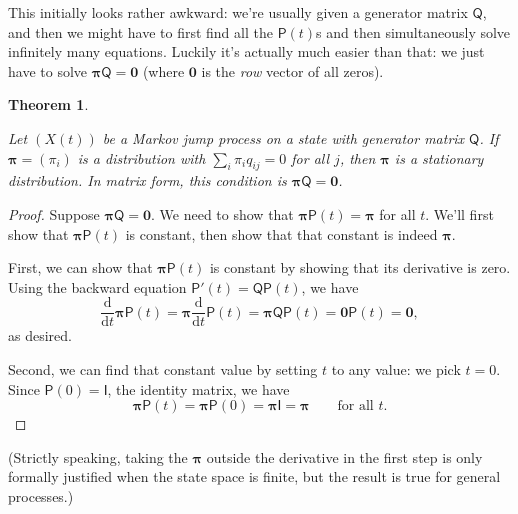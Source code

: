 \documentclass[
  a4paper,
]{article}
\newtheorem{theorem}{Theorem}[section]
\theoremstyle{definition}
\theoremstyle{definition}
\theoremstyle{definition}
\theoremstyle{remark}
\begin{document}
This initially looks rather awkward: we're usually given a generator matrix \(\mathsf Q\), and then we might have to first find all the \(\mathsf P(t)\)s and then simultaneously solve infinitely many equations. Luckily it's actually much easier than that: we just have to solve \(\boldsymbol\pi \mathsf Q = \mathbf 0\) (where \(\mathbf 0\) is the \emph{row} vector of all zeros).

\begin{theorem}
\protect\hypertarget{thm:statQ}{}\label{thm:statQ}

Let \((X(t))\) be a Markov jump process on a state with generator matrix \(\mathsf Q\). If \(\boldsymbol\pi = (\pi_i)\) is a distribution with \(\sum_i \pi_i q_{ij} = 0\) for all \(j\), then \(\boldsymbol\pi\) is a stationary distribution. In matrix form, this condition is \(\boldsymbol\pi \mathsf Q = \mathbf 0\).

\end{theorem}

\begin{proof}

Suppose \(\boldsymbol\pi \mathsf Q = \mathbf 0\). We need to show that \(\boldsymbol\pi\mathsf P(t) = \boldsymbol\pi\) for all \(t\). We'll first show that \(\boldsymbol\pi\mathsf P(t)\) is constant, then show that that constant is indeed \(\boldsymbol\pi\).

First, we can show that \(\boldsymbol \pi\mathsf P(t)\) is constant by showing that its derivative is zero. Using the backward equation \(\mathsf P'(t) = \mathsf Q \mathsf P(t)\), we have
\[ \frac{\mathrm d}{\mathrm dt}\boldsymbol \pi\mathsf P(t) = \boldsymbol \pi \frac{\mathrm d}{\mathrm dt} \mathsf P(t) = \boldsymbol \pi \mathsf Q \mathsf P(t) = \boldsymbol 0 \mathsf P(t) = \boldsymbol 0, \]
as desired.

Second, we can find that constant value by setting \(t\) to any value: we pick \(t = 0\). Since \(\mathsf P(0) = \mathsf I\), the identity matrix, we have
\[ \boldsymbol \pi\mathsf P(t) = \boldsymbol \pi\mathsf P(0) = \boldsymbol \pi\mathsf I = \boldsymbol \pi \qquad \text{for all $t$.} \]

\end{proof}

(Strictly speaking, taking the \(\boldsymbol\pi\) outside the derivative in the first step is only formally justified when the state space is finite, but the result is true for general processes.)
\end{document}
